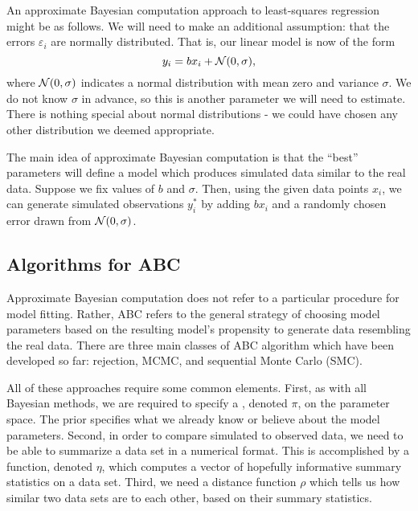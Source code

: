 An approximate Bayesian computation approach to least-squares regression might
be as follows. We will need to make an additional assumption: that the errors
$\varepsilon_i$ are normally distributed. That is, our linear model is now of
the form
\[
  y_i = bx_i + \mathcal{N}(0, \sigma),
\]
where $\mathcal{N}(0, \sigma)$ indicates a normal distribution with mean zero and
variance $\sigma$. We do not know $\sigma$ in advance, so this is another
parameter we will need to estimate. There is nothing special about normal
distributions - we could have chosen any other distribution we deemed
appropriate. 

The main idea of approximate Bayesian computation is that the ``best''
parameters will define a model which produces simulated data similar to the
real data. Suppose we fix values of $b$ and $\sigma$. Then, using the given
data points $x_i$, we can generate simulated observations $y_i^*$ by adding
$bx_i$ and a randomly chosen error drawn from $\mathcal{N}(0, \sigma)$.

\subsection{Algorithms for ABC}
\label{subsubsec:abcalg}

Approximate Bayesian computation does not refer to a particular procedure for
model fitting. Rather, ABC refers to the general strategy of choosing model
parameters based on the resulting model's propensity to generate data
resembling the real data. There are three main classes of ABC algorithm which
have been developed so far: rejection, \gls{MCMC}, and sequential Monte Carlo
(SMC). 

All of these approaches require some common elements. First, as with all
Bayesian methods, we are required to specify a ,
denoted $\pi$, on the parameter space. The prior specifies what we already know
or believe about the model parameters. Second, in order to compare simulated to
observed data, we need to be able to summarize a data set in a numerical
format. This is accomplished by a function, denoted $\eta$, which computes a
vector of hopefully informative summary statistics on a data set. Third, we
need a distance function $\rho$ which tells us how similar two data sets are to
each other, based on their summary statistics.

